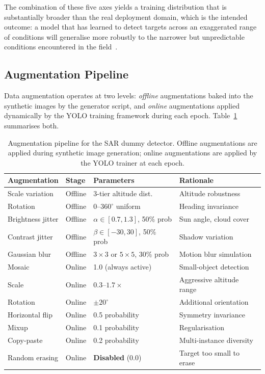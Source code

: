 The combination of these five axes yields a training distribution that is substantially broader than the real deployment domain, which is the intended outcome: a model that has learned to detect targets across an exaggerated range of conditions will generalise more robustly to the narrower but unpredictable conditions encountered in the field~\cite{synthdata}.

\subsection{Augmentation Pipeline}\label{sec:training:augmentation}

Data augmentation operates at two levels: \emph{offline} augmentations baked into the synthetic images by the generator script, and \emph{online} augmentations applied dynamically by the YOLO training framework during each epoch. Table~\ref{tab:augmentation} summarises both.

\begin{table}[ht]
    \centering
    \caption{Augmentation pipeline for the SAR dummy detector. Offline augmentations are applied during synthetic image generation; online augmentations are applied by the YOLO trainer at each epoch.}
    \label{tab:augmentation}
    \begin{tabular}{@{}llll@{}}
        \toprule
        \textbf{Augmentation} & \textbf{Stage} & \textbf{Parameters} & \textbf{Rationale} \\
        \midrule
        Scale variation & Offline & 3-tier altitude dist. & Altitude robustness \\
        Rotation & Offline & $0$--$360^{\circ}$ uniform & Heading invariance \\
        Brightness jitter & Offline & $\alpha \in [0.7, 1.3]$, 50\% prob & Sun angle, cloud cover \\
        Contrast jitter & Offline & $\beta \in [-30, 30]$, 50\% prob & Shadow variation \\
        Gaussian blur & Offline & $3\!\times\!3$ or $5\!\times\!5$, 30\% prob & Motion blur simulation \\
        \midrule
        Mosaic & Online & 1.0 (always active) & Small-object detection \\
        Scale & Online & $0.3$--$1.7\times$ & Aggressive altitude range \\
        Rotation & Online & $\pm 20^{\circ}$ & Additional orientation \\
        Horizontal flip & Online & 0.5 probability & Symmetry invariance \\
        Mixup & Online & 0.1 probability & Regularisation \\
        Copy-paste & Online & 0.2 probability & Multi-instance diversity \\
        Random erasing & Online & \textbf{Disabled} (0.0) & Target too small to erase \\
        \bottomrule
    \end{tabular}
\end{table}

